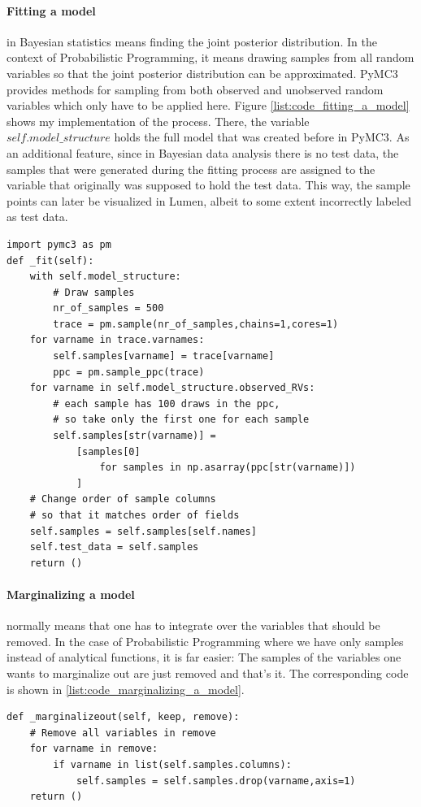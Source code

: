 \documentclass{article}
\begin{document}
\paragraph{Fitting a model} in Bayesian statistics means finding the joint posterior distribution. In the context of Probabilistic Programming, it means drawing samples from all random variables so that the joint posterior distribution can be approximated. PyMC3 provides methods for sampling from both observed and unobserved random variables which only have to be applied here. Figure \ref{list:code_fitting_a_model} shows my implementation of the process. There, the variable $self.model\_structure$ holds the full model that was created before in PyMC3. As an additional feature, since in Bayesian data analysis there is no test data, the samples that were generated during the fitting process are assigned to the variable that originally was supposed to hold the test data. This way, the sample points can later be visualized in Lumen, albeit to some extent incorrectly labeled as test data.
\begin{lstlisting}[caption={Implementation of fitting a model}, label={list:code_fitting_a_model},captionpos=b]
import pymc3 as pm
def _fit(self):
    with self.model_structure:
        # Draw samples
        nr_of_samples = 500
        trace = pm.sample(nr_of_samples,chains=1,cores=1)
    for varname in trace.varnames:
        self.samples[varname] = trace[varname]
        ppc = pm.sample_ppc(trace)
    for varname in self.model_structure.observed_RVs:
        # each sample has 100 draws in the ppc, 
        # so take only the first one for each sample
        self.samples[str(varname)] = 
            [samples[0] 
                for samples in np.asarray(ppc[str(varname)])
            ]			
    # Change order of sample columns 
    # so that it matches order of fields
    self.samples = self.samples[self.names]
    self.test_data = self.samples
    return ()
\end{lstlisting}
\paragraph{Marginalizing a model} normally means that one has to integrate over the variables that should be removed. In the case of Probabilistic Programming where we have only samples instead of analytical functions, it is far easier: The samples of the variables one wants to marginalize out are just removed and that's it. The corresponding code is shown in \autoref{list:code_marginalizing_a_model}.
\begin{lstlisting}[caption={Implementation of marginalizing a model}, label={list:code_marginalizing_a_model},captionpos=b]
def _marginalizeout(self, keep, remove):
    # Remove all variables in remove
    for varname in remove:
        if varname in list(self.samples.columns):
            self.samples = self.samples.drop(varname,axis=1)
    return ()
\end{lstlisting}
\end{document}
